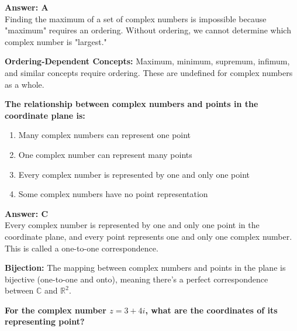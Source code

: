 \documentclass[12pt,a4paper]{article}
\begin{document}
\begin{answerstyle}
\textbf{Answer: A} \\
Finding the maximum of a set of complex numbers is impossible because "maximum" requires an ordering. Without ordering, we cannot determine which complex number is "largest."
\end{answerstyle}

\begin{conceptbox}
\textbf{Ordering-Dependent Concepts:} Maximum, minimum, supremum, infimum, and similar concepts require ordering. These are undefined for complex numbers as a whole.
\end{conceptbox}

\newpage
\begin{questiontitle}[MCQ 73]
\textbf{The relationship between complex numbers and points in the coordinate plane is:}
\end{questiontitle}

\begin{partbox}[Options]
\begin{enumerate}[label=\Alph*.]
    \item Many complex numbers can represent one point
    \item One complex number can represent many points
    \item Every complex number is represented by one and only one point
    \item Some complex numbers have no point representation
\end{enumerate}
\end{partbox}

\begin{answerstyle}
\textbf{Answer: C} \\
Every complex number is represented by one and only one point in the coordinate plane, and every point represents one and only one complex number. This is called a one-to-one correspondence.
\end{answerstyle}

\begin{conceptbox}
\textbf{Bijection:} The mapping between complex numbers and points in the plane is bijective (one-to-one and onto), meaning there's a perfect correspondence between \( \mathbb{C} \) and \( \mathbb{R}^2 \).
\end{conceptbox}

\newpage
\begin{questiontitle}[MCQ 74]
\textbf{For the complex number \( z = 3 + 4i \), what are the coordinates of its representing point?}
\end{questiontitle}
\end{document}
